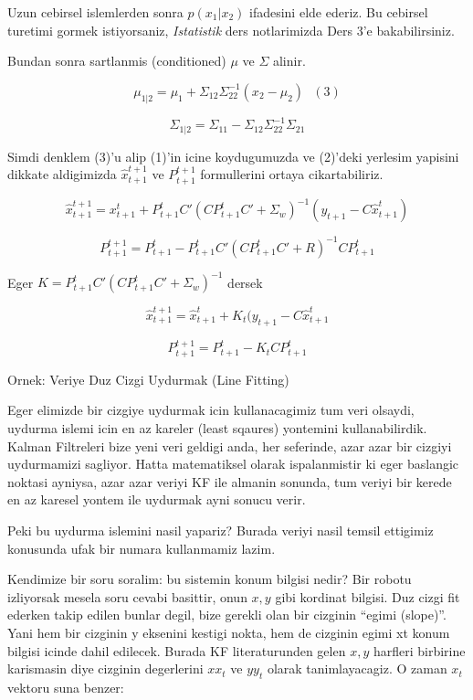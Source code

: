 \documentclass[12pt,fleqn]{article}\usepackage{../common}
\begin{document}
Uzun cebirsel islemlerden sonra $p(x_1|x_2)$ ifadesini elde ederiz. Bu
cebirsel turetimi gormek istiyorsaniz, {\em Istatistik} ders notlarimizda
Ders 3'e bakabilirsiniz.

Bundan sonra sartlanmis (conditioned) $\mu$ ve $\Sigma$ alinir.

\[ 
\mu_{1|2} = \mu_1 + \Sigma_{12}\Sigma_{22}^{-1}(x_2 - \mu_2) 
\ \ \ (3)
\]

\[ \Sigma_{1|2} = \Sigma_{11}- \Sigma_{12}\Sigma_{22}^{-1}\Sigma_{21} \]

Simdi denklem (3)'u alip (1)'in icine koydugumuzda ve (2)'deki
yerlesim yapisini dikkate aldigimizda $\hat{x}_{t+1}^{t+1}$ ve
$P_{t+1}^{t+1}$ formullerini ortaya cikartabiliriz.

\[ \hat{x}_{t+1}^{t+1} =  x_{t+1}^{t} +  P_{t+1}^{t}C'(CP_{t+1}^{t}C' + \Sigma_w)^{-1}
(y_{t+1}- C\hat{x}_{t+1}^t)
\]

\[ P_{t+1}^{t+1} = P_{t+1}^{t} - P_{t+1}^{t} C'(CP_{t+1}^{t} C'+R)^{-1}CP_{t+1}^{t} 
\]

Eger $K = P_{t+1}^{t}C'(CP_{t+1}^{t}C' + \Sigma_w)^{-1}$ dersek

\[  \hat{x}_{t+1}^{t+1}  =  \hat{x}_{t+1}^{t} + K_t (y_{t+1} - C \hat{x}_{t+1}^{t}  \]

\[  P_{t+1}^{t+1} =  P_{t+1}^{t} - K_tC P_{t+1}^{t} \]

Ornek: Veriye Duz Cizgi Uydurmak (Line Fitting)

Eger elimizde bir cizgiye uydurmak icin kullanacagimiz tum veri olsaydi,
uydurma islemi icin en az kareler (least sqaures) yontemini
kullanabilirdik.  Kalman Filtreleri bize yeni veri geldigi anda, her
seferinde, azar azar bir cizgiyi uydurmamizi sagliyor. Hatta matematiksel
olarak ispalanmistir ki eger baslangic noktasi ayniysa, azar azar veriyi KF
ile almanin sonunda, tum veriyi bir kerede en az karesel yontem ile
uydurmak ayni sonucu verir.

Peki bu uydurma islemini nasil yapariz? Burada veriyi nasil temsil ettigimiz
konusunda ufak bir numara kullanmamiz lazim.

Kendimize bir soru soralim: bu sistemin konum bilgisi nedir? Bir robotu
izliyorsak mesela soru cevabi basittir, onun $x, y$ gibi kordinat
bilgisi. Duz cizgi fit ederken takip edilen bunlar degil, bize gerekli olan
bir cizginin ``egimi (slope)''. Yani hem bir cizginin y eksenini kestigi
nokta, hem de cizginin egimi xt konum bilgisi icinde dahil edilecek. Burada
KF literaturunden gelen $x, y$ harfleri birbirine karismasin diye cizginin
degerlerini $xx_t$ ve $yy_t$ olarak tanimlayacagiz. O zaman $x_t$ vektoru suna
benzer:
\end{document}
